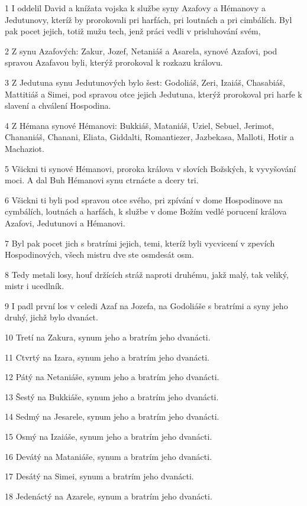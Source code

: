 \par 1 I oddelil David a knížata vojska k službe syny Azafovy a Hémanovy a Jedutunovy, kteríž by prorokovali pri harfách, pri loutnách a pri cimbálích. Byl pak pocet jejich, totiž mužu tech, jenž práci vedli v prisluhování svém,
\par 2 Z synu Azafových: Zakur, Jozef, Netaniáš a Asarela, synové Azafovi, pod spravou Azafavou byli, kterýž prorokoval k rozkazu královu.
\par 3 Z Jedutuna synu Jedutunových bylo šest: Godoliáš, Zeri, Izaiáš, Chasabiáš, Mattitiáš a Simei, pod spravou otce jejich Jedutuna, kterýž prorokoval pri harfe k slavení a chválení Hospodina.
\par 4 Z Hémana synové Hémanovi: Bukkiáš, Mataniáš, Uziel, Sebuel, Jerimot, Chananiáš, Chanani, Eliata, Giddalti, Romantiezer, Jazbekasa, Malloti, Hotir a Machaziot.
\par 5 Všickni ti synové Hémanovi, proroka králova v slovích Božských, k vyvyšování moci. A dal Buh Hémanovi synu ctrnácte a dcery tri.
\par 6 Všickni ti byli pod spravou otce svého, pri zpívání v dome Hospodinove na cymbálích, loutnách a harfách, k službe v dome Božím vedlé porucení králova Azafovi, Jedutunovi a Hémanovi.
\par 7 Byl pak pocet jich s bratrími jejich, temi, kteríž byli vycvicení v zpevích Hospodinových, všech mistru dve ste osmdesát osm.
\par 8 Tedy metali losy, houf držících stráž naproti druhému, jakž malý, tak veliký, mistr i ucedlník.
\par 9 I padl první los v celedi Azaf na Jozefa, na Godoliáše s bratrími a syny jeho druhý, jichž bylo dvanáct.
\par 10 Tretí na Zakura, synum jeho a bratrím jeho dvanácti.
\par 11 Ctvrtý na Izara, synum jeho a bratrím jeho dvanácti.
\par 12 Pátý na Netaniáše, synum jeho a bratrím jeho dvanácti.
\par 13 Šestý na Bukkiáše, synum jeho a bratrím jeho dvanácti.
\par 14 Sedmý na Jesarele, synum jeho a bratrím jeho dvanácti.
\par 15 Osmý na Izaiáše, synum jeho a bratrím jeho dvanácti.
\par 16 Devátý na Mataniáše, synum a bratrím jeho dvanácti.
\par 17 Desátý na Simei, synum a bratrím jeho dvanácti.
\par 18 Jedenáctý na Azarele, synum a bratrím jeho dvanácti.
